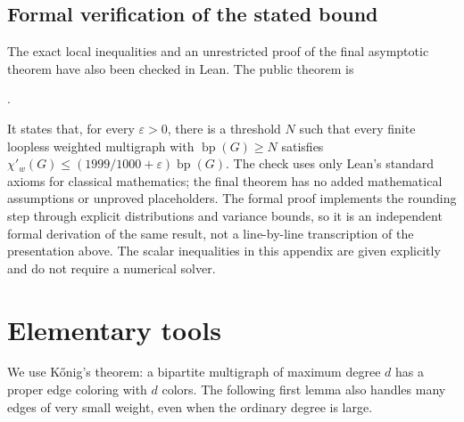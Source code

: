 \documentclass[11pt]{article}
\theoremstyle{definition}\newtheorem{algorithm}{Algorithm}[section]
\numberwithin{equation}{section}
\theoremstyle{remark}\newtheorem*{remark}{Remark}
\newcommand{\bp}{\operatorname{bp}}
\begin{document}
\subsection{Formal verification of the stated bound}
\label{app:subtwo-formal-verification}
The exact local inequalities and an unrestricted proof of the final
asymptotic theorem have also been checked in Lean. The public theorem is
\begin{center}
\small{}.
\end{center}
It states that, for every $\varepsilon>0$, there is a threshold $N$
such that every finite loopless weighted multigraph with $\bp(G)\ge N$
satisfies
$\chi'_w(G)\le(1999/1000+\varepsilon)\bp(G)$.
The check uses only Lean's standard axioms for classical mathematics;
the final theorem has no added mathematical assumptions or unproved
placeholders. The formal proof implements the rounding step through
explicit distributions and variance bounds, so it is an independent
formal derivation of the same result, not a line-by-line transcription
of the presentation above. The scalar inequalities in this appendix
are given explicitly and do not require a numerical solver.

\section{Elementary tools}\label{sec:elementary}
We use K\H{o}nig's theorem: a bipartite multigraph of maximum degree $d$
has a proper edge coloring with $d$ colors. The following first lemma
also handles many edges of very small weight, even when the ordinary
degree is large.
\end{document}
